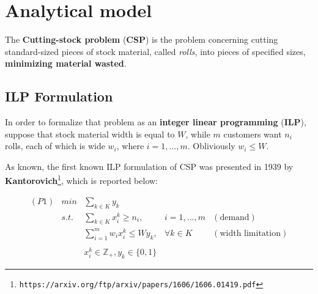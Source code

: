\documentclass[10pt,a4paper]{article}
\begin{document}
\begin{frontespizio} 
\end{frontespizio} 

\tableofcontents
\newpage


\section{Analytical model}

The \textbf{Cutting-stock problem} (\textbf{CSP}) is the problem concerning cutting standard-sized pieces of stock material, called \textit{rolls}, into pieces of specified sizes, \textbf{minimizing material wasted}.

\subsection{ILP Formulation}

In order to formalize that problem as an \textbf{integer linear programming} (\textbf{ILP}), suppose that stock material width is equal to $W$, while $m$ customers want $n_i$ rolls, each of which is wide $w_i$, where $i = 1,...,m$. Obliviously $w_i \leq W$.

As known, the first known ILP formulation of CSP was presented in 1939 by \textbf{Kantorovich}\footnote{\texttt{https://arxiv.org/ftp/arxiv/papers/1606/1606.01419.pdf}}, which is reported below:


\begin{equation}\label{eqn:P1}
\begin{array} {lllrr} 

(P1) & min & \displaystyle\sum_{k \in K} y_k && \\
& s.t. & \displaystyle\sum_{k \in K} x_i^k \geq n_i, & i = 1,...,m & (\text{demand}) \\
&& \displaystyle\sum_{i = 1}^m w_i x_i^k \leq W y_k, & \forall k \in K & (\text{width limitation}) \\\\
&& x_i^k \in \mathbb{Z}_{+}, y_k \in \lbrace 0, 1 \rbrace &&
\end{array}
\end{equation}
\end{document}
